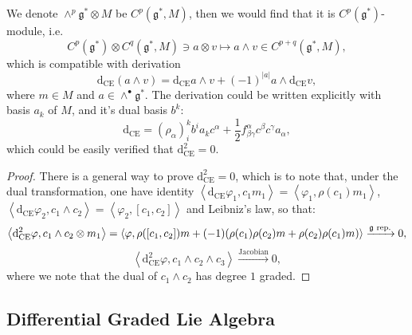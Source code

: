 \documentclass[10pt]{article}
\begin{document}
We denote $\wedge^{p} \mathfrak{g}^{*} \otimes M$ be $ C^{p}(\mathfrak{g}^{*}, M)$, then we would find that it is $ C^{p}(\mathfrak{g}^{*})$-module, i.e.
\begin{equation*}
  C^{p}(\mathfrak{g}^{*}) \otimes C^{q}(\mathfrak{g}^{*}, M) \ni a \otimes v \mapsto a \wedge v \in C^{p+q}(\mathfrak{g}^{*}, M),
\end{equation*}
which is compatible with derivation
\begin{equation*}
  \mathrm{d} _{\mathrm{CE}} (a\wedge v) = \mathrm{d} _{\mathrm{CE}} a \wedge v + (-1)^{\left| a \right|} a \wedge \mathrm{d} _{\mathrm{CE}} v,
\end{equation*}
where $ m \in M$ and $ a \in \wedge^{\bullet} \mathfrak{g}^{*}$. The derivation could be written explicitly with basis $ a_{k}$ of $ M$, and it's dual basis $ b^{k}$:
\begin{equation*}
  \mathrm{d} _{\mathrm{CE}} = \left( \rho_{\alpha} \right)^{k}_{i} b^{i} a_{k} c^{\alpha} + \frac{1}{2} f^{\alpha}_{\beta \gamma} c^{\beta} c^{\gamma} a_{\alpha},
\end{equation*}
which could be easily verified that $ \mathrm{d} ^{2}_{\mathrm{CE}} = 0$.
\begin{proof}
  There is a general way to prove $ \mathrm{d} _{\mathrm{CE}}^{2} = 0$, which is to note that, under the dual transformation, one have identity $\left< \mathrm{d} _{\mathrm{CE}} \varphi_1 , c_1 m_1 \right> = \left< \varphi_1, \rho(c_1) m_1 \right>$, $\left< \mathrm{d} _{\mathrm{CE}} \varphi_2, c_{1}\wedge c_{2} \right> = \left< \varphi_2, [c_1, c_2] \right>$ and Leibniz's law, so that:
  \begin{equation*}
    \left< \mathrm{d} ^{2}_{\mathrm{CE}} \varphi, c_1 \wedge c_2 \otimes m_1 \right> = \left< \varphi , \rho([c_1, c_2]) m + (-1)( \rho(c_1) \rho(c_2) m + \rho(c_2) \rho(c_1) m ) \right> \xrightarrow{\text{$ \mathfrak{g}$ rep.}} 0,
  \end{equation*}
  \begin{equation*}
    \left< \mathrm{d} ^{2}_{\mathrm{CE}} \varphi, c_1 \wedge c_2 \wedge c_3 \right> \xrightarrow{\text{Jacobian}} 0,
  \end{equation*}
  where we note that the dual of $ c_1 \wedge c_2$ has degree $ 1$ graded.
\end{proof}

\subsection{Differential Graded Lie Algebra}
\end{document}
